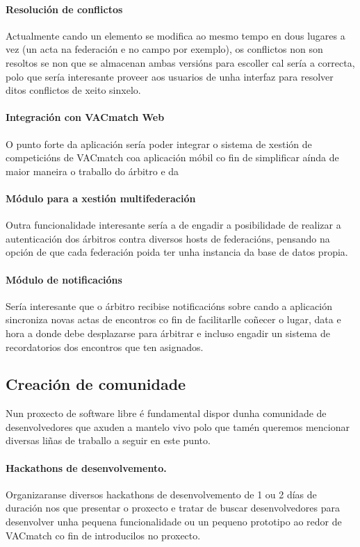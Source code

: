     \paragraph{Resolución de conflictos} Actualmente cando un elemento se 
modifica ao mesmo tempo en dous lugares a vez (un acta na federación e no campo 
por exemplo), os conflictos non son resoltos se non que se almacenan ambas 
versións para escoller cal sería a correcta, polo que sería interesante proveer 
aos usuarios de unha interfaz para resolver ditos conflictos de xeito sinxelo.

    \paragraph{Integración con VACmatch Web} O punto forte da aplicación sería 
poder integrar o sistema de xestión de competicións de VACmatch coa aplicación 
móbil co fin de simplificar aínda de maior maneira o traballo do árbitro e da 

    \paragraph{Módulo para a xestión multifederación} Outra funcionalidade 
interesante sería a de engadir a posibilidade de realizar a autenticación dos 
árbitros contra diversos hosts de federacións, pensando na opción de que cada 
federación poida ter unha instancia da base de datos propia.

    \paragraph{Módulo de notificacións} Sería interesante que o árbitro 
recibise notificacións sobre cando a aplicación sincroniza novas actas de 
encontros co fin de facilitarlle coñecer o lugar, data e hora a donde debe 
desplazarse para árbitrar e incluso engadir un sistema de recordatorios dos 
encontros que ten asignados.

  \subsection{Creación de comunidade}
  Nun proxecto de software libre é fundamental dispor dunha comunidade de 
desenvolvedores que axuden a mantelo vivo polo que tamén queremos mencionar 
diversas liñas de traballo a seguir en este punto.

    \paragraph{Hackathons de desenvolvemento.} Organizaranse diversos 
hackathons de desenvolvemento de 1 ou 2 días de duración nos que presentar o 
proxecto e tratar de buscar desenvolvedores para desenvolver unha pequena 
funcionalidade ou un pequeno prototipo ao redor de VACmatch co fin de 
introducilos no proxecto.

